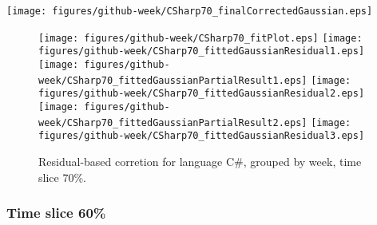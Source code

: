 \begin{center}
{\texttt{[image: figures/github-week/CSharp70\_finalCorrectedGaussian.eps]}}
\end{center}

\FloatBarrier

\begin{figure}[t]
\centering
{}
{\texttt{[image: figures/github-week/CSharp70\_fitPlot.eps]}}
{\texttt{[image: figures/github-week/CSharp70\_fittedGaussianResidual1.eps]}}
{\texttt{[image: figures/github-week/CSharp70\_fittedGaussianPartialResult1.eps]}}
{\texttt{[image: figures/github-week/CSharp70\_fittedGaussianResidual2.eps]}}
{\texttt{[image: figures/github-week/CSharp70\_fittedGaussianPartialResult2.eps]}}
{\texttt{[image: figures/github-week/CSharp70\_fittedGaussianResidual3.eps]}}
\caption{Residual-based corretion for language C\#, grouped by week, time slice 70\%.}
\end{figure}


\FloatBarrier


\subsubsection{Time slice 60\%}

